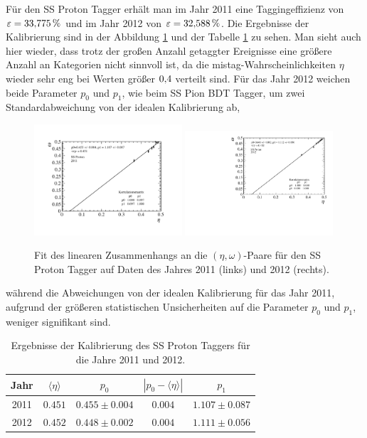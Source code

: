 Für den SS Proton Tagger erhält man im Jahr \num{2011} eine Taggingeffizienz von $\varepsilon=\SI{33{,}775}{\%}$ und im Jahr \num{2012} von $\varepsilon=\SI{32{,}588}{\%}$. Die Ergebnisse der Kalibrierung sind in der Abbildung \ref{fig:fit_SSProton} und der Tabelle \ref{tab:result_SSProton} zu sehen. Man sieht auch hier wieder, dass trotz der großen Anzahl getaggter Ereignisse eine größere Anzahl an Kategorien nicht sinnvoll ist, da die mistag-Wahrscheinlichkeiten $\eta$ wieder sehr eng bei Werten größer $\num{0{,}4}$ verteilt sind. Für das Jahr \num{2012} weichen beide Parameter $p_0$ und $p_1$, wie beim SS Pion BDT Tagger, um zwei Standardabweichung von der idealen Kalibrierung ab, 
\begin{figure}[htbp]
	\centering
		\includegraphics[width=0.49\textwidth]{fig/2011_SSProton.pdf}
		\includegraphics[width=0.49\textwidth]{fig/2012_SSProton.pdf}
	\caption{Fit des linearen Zusammenhangs an die $(\eta,\omega)$-Paare für den SS Proton Tagger auf Daten des Jahres \num{2011} (links) und \num{2012} (rechts).}
	\label{fig:fit_SSProton} 
\end{figure}
während die Abweichungen von der idealen Kalibrierung für das Jahr \num{2011}, aufgrund der größeren statistischen Unsicherheiten auf die Parameter $p_0$ und $p_1$, weniger signifikant sind.
\begin{table}[htbp]
	\centering
	\caption{Ergebnisse der Kalibrierung des SS Proton Taggers für die Jahre \num{2011} und \num{2012}.}
	\label{tab:result_SSProton}
	\begin{tabular}{ccccc}
	\toprule
       Jahr & $\langle\eta\rangle$ & $p_0$ & $\left|p_0-\langle\eta\rangle\right|$ & $p_1$ \\ 
       \midrule
	2011 & $0{.}451$ & $0{.}455\pm0{.}004$ & $0{.}004$ & $1{.}107\pm0{.}087$ \\
   2012 & $0{.}452$ & $0{.}448\pm0{.}002$ & $0{.}004$ & $1{.}111\pm0{.}056$ \\ 
   \bottomrule
	\end{tabular}
\end{table}
